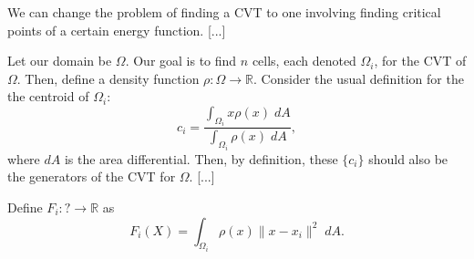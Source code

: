 \documentclass{article}
\begin{document}

We can change the problem of finding a CVT to one involving finding critical points of a certain energy function. [...]

Let our domain be $\Omega$. Our goal is to find $n$ cells, each denoted $\Omega_i$, for the CVT of $\Omega$. Then, define a density function $\rho : \Omega \to \mathbb{R}$. Consider the usual definition for the the centroid of $\Omega_i$:
$$c_i = \frac
    {\int_{\Omega_i} x \rho(x) \; dA}
    {\int_{\Omega_i} \rho(x) \; dA},$$
where $dA$ is the area differential. Then, by definition, these $\{c_i\}$ should also be the generators of the CVT for $\Omega$. [...]

Define $F_i : ? \to \mathbb{R}$ as
$$F_i(X) = \int_{\Omega_i} \rho(x) \|x - x_i\|^2 \; dA.$$
\end{document}
